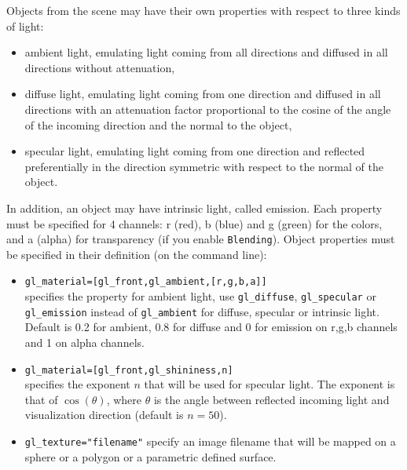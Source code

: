 \documentclass{article}
\begin{document}
Objects from the scene may
have their own properties with respect to three kinds of light:
\begin{itemize}
\item ambient light,
emulating light coming from all directions and diffused
in all directions without attenuation, 
\item diffuse light,
emulating light coming from one direction and diffused in all directions
with an attenuation factor proportional to the cosine of the
angle of the incoming direction and the normal to the object,
\item specular light,
emulating light coming from one direction and reflected 
preferentially in the direction symmetric with respect to
the normal of the object.
\end{itemize}
In addition, an object may have intrinsic light, called emission.
Each property must be specified for 4 channels: r (red), b (blue)
and g (green) for the colors, and a (alpha) for transparency (if
you enable \verb|Blending|).
Object properties must be specified in their definition (on 
the command line):
\begin{itemize}
\item \verb|gl_material=[gl_front,gl_ambient,[r,g,b,a]]|\\ 
specifies the property for ambient light, use 
\verb|gl_diffuse|, \verb|gl_specular| or \verb|gl_emission|
instead of \verb|gl_ambient| for diffuse, specular or intrinsic
light. Default is 0.2 for ambient, 0.8 for diffuse and 0 for emission
on r,g,b channels and 1 on alpha channels.
\item
\verb|gl_material=[gl_front,gl_shininess,n]|\\
specifies the exponent $n$ that will be used for specular light. The
exponent is that of $\cos(\theta)$, where $\theta$ is the angle
between reflected incoming light and visualization direction (default
is $n=50$).
\item
\verb|gl_texture="filename"| specify an image filename that
will be mapped on a sphere or a polygon or a parametric
defined surface.
\end{itemize} 
\end{document}
